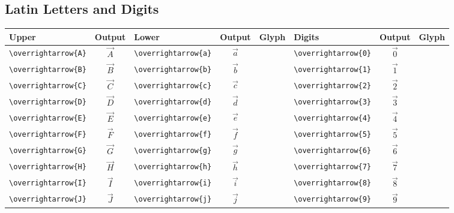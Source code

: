 \documentclass[12pt,a4paper]{article}
\begin{document}
\subsection*{Latin Letters and Digits}
\begin{longtable}{|l|c|l|c|c|l|c|c|}
\hline
\textbf{Upper}            & \textbf{Output}      & \textbf{Lower}            & \textbf{Output}      & \textbf{Glyph} & \textbf{Digits}           & \textbf{Output}      & \textbf{Glyph} \\
\hline
\verb|\overrightarrow{A}| & $\overrightarrow{A}$ & \verb|\overrightarrow{a}| & $\overrightarrow{a}$ &                & \verb|\overrightarrow{0}| & $\overrightarrow{0}$ & \\
\verb|\overrightarrow{B}| & $\overrightarrow{B}$ & \verb|\overrightarrow{b}| & $\overrightarrow{b}$ &                & \verb|\overrightarrow{1}| & $\overrightarrow{1}$ & \\
\verb|\overrightarrow{C}| & $\overrightarrow{C}$ & \verb|\overrightarrow{c}| & $\overrightarrow{c}$ &                & \verb|\overrightarrow{2}| & $\overrightarrow{2}$ & \\
\verb|\overrightarrow{D}| & $\overrightarrow{D}$ & \verb|\overrightarrow{d}| & $\overrightarrow{d}$ &                & \verb|\overrightarrow{3}| & $\overrightarrow{3}$ & \\
\verb|\overrightarrow{E}| & $\overrightarrow{E}$ & \verb|\overrightarrow{e}| & $\overrightarrow{e}$ &                & \verb|\overrightarrow{4}| & $\overrightarrow{4}$ & \\
\verb|\overrightarrow{F}| & $\overrightarrow{F}$ & \verb|\overrightarrow{f}| & $\overrightarrow{f}$ &                & \verb|\overrightarrow{5}| & $\overrightarrow{5}$ & \\
\verb|\overrightarrow{G}| & $\overrightarrow{G}$ & \verb|\overrightarrow{g}| & $\overrightarrow{g}$ &                & \verb|\overrightarrow{6}| & $\overrightarrow{6}$ & \\
\verb|\overrightarrow{H}| & $\overrightarrow{H}$ & \verb|\overrightarrow{h}| & $\overrightarrow{h}$ &                & \verb|\overrightarrow{7}| & $\overrightarrow{7}$ & \\
\verb|\overrightarrow{I}| & $\overrightarrow{I}$ & \verb|\overrightarrow{i}| & $\overrightarrow{i}$ &                & \verb|\overrightarrow{8}| & $\overrightarrow{8}$ & \\
\verb|\overrightarrow{J}| & $\overrightarrow{J}$ & \verb|\overrightarrow{j}| & $\overrightarrow{j}$ &                & \verb|\overrightarrow{9}| & $\overrightarrow{9}$ & \\

\end{longtable}
\end{document}
